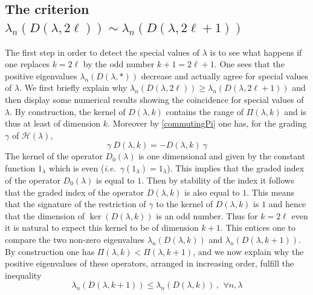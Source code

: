 \documentclass[cupthm]{CUP-JNL-JMJ}
\def\cH{{\mathcal H}}
\def\qqq{\,,\,~\forall}
\newcommand{\ie}{{\it i.e.\/}\ }
\numberwithin{equation}{section}
\theoremstyle{cupplain}
\theoremstyle{cupdefinition}
\theoremstyle{cupremark}
\theoremstyle{cupproof}
\begin{document}
    \subsection{The criterion $\lambda_n(D(\lambda,2 \ell))\sim \lambda_n(D(\lambda,2 \ell+1))$}\label{sectcriter}
    The first step in order to detect the special values of $\lambda$ is to see what happens if  one replaces $k=2\ell$ by the odd number $k+1=2\ell+1$. One sees that the positive eigenvalues $\lambda_n(D(\lambda,*))$ decrease and actually agree for special values of $\lambda$. We first briefly explain why  $\lambda_n(D(\lambda,2 \ell))\geq  \lambda_n(D(\lambda,2 \ell+1))$ and then display some numerical results showing the coincidence for special values of $\lambda$.  
   By construction, the kernel of $D(\lambda,k)$ contains the range of $\Pi(\lambda,k)$ and is thus at least of dimension $k$. Moreover by \eqref{commutingPi} one has, for the grading $\gamma$ of  $\cH(\lambda)$,
  \begin{equation}\label{diracpm}
 \gamma \ D(\lambda,k)=- D(\lambda,k) \ \gamma
  \end{equation}
  The kernel of the operator $D_0(\lambda)$ is one dimensional and given by the constant function $1_\lambda$ which is even (\ie $\gamma(1_\lambda)=1_\lambda$).
 This implies that the graded index of the operator $D_0(\lambda)$  is equal to $1$. Then by stability of the index it follows that the graded index of the operator $D(\lambda,k)$  is also equal to $1$. This means that the signature of the restriction of $\gamma$ to the  kernel of $D(\lambda,k)$ is $1$ and hence that the dimension of $\ker (D(\lambda,k))$ is an odd number. 
   Thus for $k=2\ell$ even it is natural to expect this kernel to be of dimension $k+1$. This entices one to compare the two non-zero eigenvalues $\lambda_n(D(\lambda,k))$ and $\lambda_n(D(\lambda,k+1))$. By construction one has $\Pi(\lambda,k)<\Pi(\lambda,k+1)$, and we now explain why the positive eigenvalues of these operators, arranged in increasing order, fulfill the inequality
   \begin{equation}\label{diracpm1}
  	\lambda_n(D(\lambda,k+1))\leq \lambda_n(D(\lambda,k))\qqq n,\lambda 
  \end{equation}
 
\end{document}
